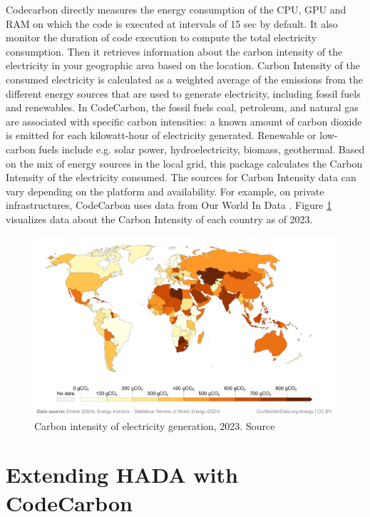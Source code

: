 \documentclass[a4paper,singleside,12pt]{report} %
\begin{document}
Codecarbon directly measures the energy consumption of the CPU, GPU and RAM on which the code is executed at intervals of 15 sec 
by default. It also monitor the duration of code execution to compute the total electricity 
consumption. Then it retrieves information about the carbon intensity of the electricity in your geographic area based on the 
location. Carbon Intensity of the consumed electricity is calculated as a weighted average of the emissions from the different
energy sources that are used to generate electricity, including fossil fuels and renewables. In CodeCarbon, the fossil fuels coal, 
petroleum, and natural gas are associated with specific carbon intensities: a known amount of carbon dioxide is emitted for each 
kilowatt-hour of electricity generated. Renewable or low-carbon fuels include e.g. solar power, hydroelectricity, biomass, geothermal.
Based on the mix of energy sources in the local grid, this package calculates the Carbon Intensity of the electricity consumed. 
The sources for Carbon Intensity data can vary depending on the platform and availability. For example, on private infrastructures,
CodeCarbon uses data from Our World In Data \cite{ember2024carbonintensity}. Figure \ref{fig:carbon_intensity} visualizes data about the Carbon Intensity of each country as of
2023.

\begin{figure}
    \includegraphics[width=\linewidth]{imgs/carbon-intensity-electricity.png}
    \caption{Carbon intensity of electricity generation, 2023. Source \cite{ember2024carbonintensity}}
    \label{fig:carbon_intensity}
\end{figure}

\section{Extending HADA with CodeCarbon}
\end{document}

